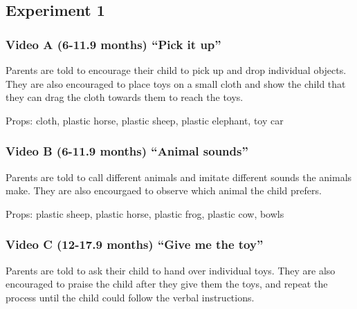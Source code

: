 \documentclass[man,floatsintext]{apa6}
\begin{document}
\endgroup

\clearpage
\makeatletter
\efloat@restorefloats
\makeatother


\begin{appendix}
\section{}
\hypertarget{experiment-1}{%
\subsection{Experiment 1}\label{experiment-1}}

\hypertarget{video-a-6-11.9-months-pick-it-up}{%
\subsubsection{Video A (6-11.9 months) ``Pick it
up''}\label{video-a-6-11.9-months-pick-it-up}}

Parents are told to encourage their child to pick up and drop individual
objects. They are also encouraged to place toys on a small cloth and
show the child that they can drag the cloth towards them to reach the
toys.

Props: cloth, plastic horse, plastic sheep, plastic elephant, toy car

\hypertarget{video-b-6-11.9-months-animal-sounds}{%
\subsubsection{Video B (6-11.9 months) ``Animal
sounds''}\label{video-b-6-11.9-months-animal-sounds}}

Parents are told to call different animals and imitate different sounds
the animals make. They are also encourgaed to observe which animal the
child prefers.

Props: plastic sheep, plastic horse, plastic frog, plastic cow, bowls

\hypertarget{video-c-12-17.9-months-give-me-the-toy}{%
\subsubsection{Video C (12-17.9 months) ``Give me the
toy''}\label{video-c-12-17.9-months-give-me-the-toy}}

Parents are told to ask their child to hand over individual toys. They
are also encouraged to praise the child after they give them the toys,
and repeat the process until the child could follow the verbal
instructions.


\end{appendix}
\end{document}
